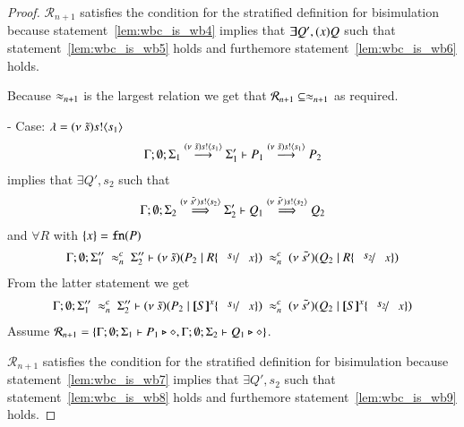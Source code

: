 \begin{proof}
	\noi $\mathcal{R}_{n+1}$ satisfies the condition for the stratified definition for bisimulation
	because statement~\ref{lem:wbc_is_wb4} implies that
	$\exists Q', (x)Q$ such that
	statement~\ref{lem:wbc_is_wb5} holds and furthemore statement~\ref{lem:wbc_is_wb6} holds.

	\noi Because $\approx_{n+1}$ is the largest relation we get that $\mathcal{R}_{n+1} \subseteq \approx_{n+1}$ as required.


	\noi - Case: $\lambda = (\nu\ \tilde{s}) s ! \langle s_1 \rangle$
%
	\begin{eqnarray}
		\Gamma; \emptyset; \Sigma_1 \stackrel{(\nu\ \tilde{s}) s ! \langle s_1 \rangle}{\longrightarrow} \Sigma_1' \vdash P_1 \stackrel{(\nu\ \tilde{s}) s ! \langle s_1 \rangle}{\longrightarrow} P_2 \label{lem:wbc_is_wb7}
	\end{eqnarray}
%
	\noi {} implies that
	$\exists Q', s_2$ such that
	\begin{eqnarray}
		\Gamma; \emptyset; \Sigma_2 \stackrel{(\nu\ \tilde{s'}) s ! \langle s_2 \rangle}{\Longrightarrow} \Sigma_2' \vdash Q_1 \stackrel{(\nu\ \tilde{s'}) s ! \langle s_2 \rangle}{\Longrightarrow} Q_2 \label{lem:wbc_is_wb8}
	\end{eqnarray}
	and $\forall R$ with $\{x\} = \mathtt{fn}(P)$
%
	\begin{eqnarray*}
		\Gamma; \emptyset; \Sigma_1''\ \wbc_{n}\ \Sigma_2'' \proves \newsp{\tilde{s}}{P_2 \Par R \subst{s_1}{x}}\ \wbc_{n}\ 
		\newsp{\tilde{s'}}{Q_2 \Par R \subst{s_2}{x}}
	\end{eqnarray*}
%
	\noi From the latter statement we get
	\begin{eqnarray*}
		\Gamma; \emptyset; \Sigma_1''\ \wbc_{n}\ \Sigma_2'' \proves \newsp{\tilde{s}}{P_2 \Par \map{S}^{x} \subst{s_1}{x}}\ \wbc_{n}\ 
		\newsp{\tilde{s'}}{Q_2 \Par \map{S}^{x} \subst{s_2}{x}} \label{lem:wbc_is_wb9}
	\end{eqnarray*}
%
	\noi Assume $\mathcal{R}_{n+1} = \{\Gamma; \emptyset; \Sigma_1 \vdash P_1 \triangleright \diamond, \Gamma; \emptyset; \Sigma_2 \vdash Q_1 \triangleright \diamond\}$.

	\noi $\mathcal{R}_{n+1}$ satisfies the condition for the stratified definition for bisimulation
	because statement~\ref{lem:wbc_is_wb7} implies that
	$\exists Q', s_2$ such that
	statement~\ref{lem:wbc_is_wb8} holds and furthemore statement~\ref{lem:wbc_is_wb9} holds.
\end{proof}

